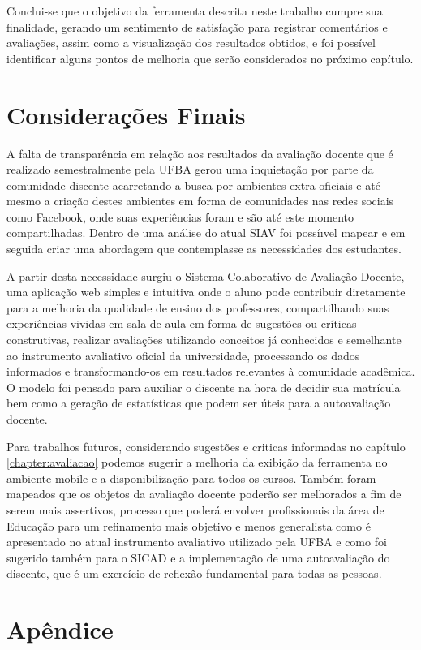 \documentclass[12pt, a4paper]{report}
\begin{document}
Conclui-se que o objetivo da ferramenta descrita neste trabalho cumpre sua finalidade, gerando um sentimento de satisfação para registrar comentários e avaliações, assim como a visualização dos resultados obtidos, e foi possível identificar alguns pontos de melhoria que serão considerados no próximo capítulo.


\chapter{Considerações Finais}
\label{chap:consideracoes}

A falta de transparência em relação aos resultados da avaliação docente que é realizado semestralmente pela UFBA gerou uma inquietação por parte da comunidade discente acarretando a busca por ambientes extra oficiais e até mesmo a criação destes ambientes em forma de comunidades nas redes sociais como Facebook, onde suas experiências foram e são até este momento compartilhadas. Dentro de uma análise do atual SIAV foi possíıvel mapear e em seguida criar uma abordagem que contemplasse as necessidades dos estudantes.

A partir desta necessidade surgiu o Sistema Colaborativo de Avaliação Docente, uma aplicação web simples e intuitiva onde o aluno pode contribuir diretamente para a melhoria da qualidade de ensino dos professores, compartilhando suas experiências vividas em sala de aula em forma de sugestões ou críticas construtivas, realizar avaliações utilizando conceitos já conhecidos e semelhante ao instrumento avaliativo oficial da universidade, processando os dados informados e transformando-os em resultados relevantes à comunidade acadêmica. O modelo foi pensado para auxiliar o discente na hora de decidir sua matrícula bem como a geração de estatísticas que podem ser úteis para a autoavaliação docente.

Para trabalhos futuros, considerando sugestões e criticas informadas no capítulo \ref{chapter:avaliacao} podemos sugerir a melhoria da exibição da ferramenta no ambiente mobile e a disponibilização para todos os cursos. Também foram mapeados que os objetos da avaliação docente poderão ser melhorados a fim de serem mais assertivos, processo que poderá envolver profissionais da área de Educação para um refinamento mais objetivo e menos generalista como é apresentado no atual instrumento avaliativo utilizado pela UFBA e como foi sugerido também para o SICAD e a implementação de uma autoavaliação do discente, que é um exercício de reflexão fundamental para todas as pessoas. 


\renewcommand\bibname{Referências}

%
%

\nocite{*}


\appendix
\chapter{Apêndice}
\label{ape:apendice}




\end{document}
